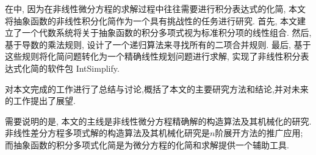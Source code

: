 在中, 因为在非线性微分方程的求解过程中往往需要进行积分表达式的化简, 本文将抽象函数的非线性积分化简作为一个具有挑战性的任务进行研究. 首先, 本文建立了一个代数系统将关于抽象函数的积分多项式视为标准积分项的线性组合. 然后, 基于导数的乘法规则, 设计了一个递归算法来寻找所有的二项合并规则. 最后, 基于这些规则将化简问题转化为一个精确线性规划问题进行求解, 实现了非线性积分表达式化简的软件包 IntSimplify.  

对本文完成的工作进行了总结与讨论,概括了本文的主要研究方法和结论,并对未来的工作提出了展望.

需要说明的是, 本文的主线是非线性微分方程精确解的构造算法及其机械化的研究. 非线性差分方程多项式解的构造算法及其机械化研究是$n$阶展开方法的推广应用; 而抽象函数的积分多项式化简是为微分方程的化简和求解提供一个辅助工具. 
